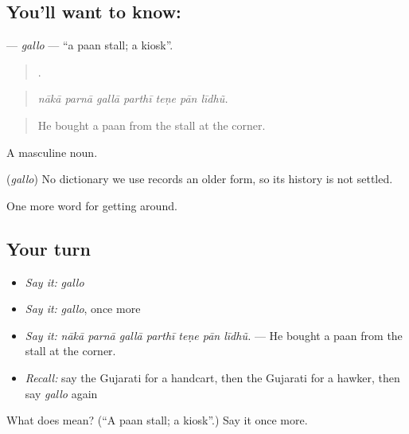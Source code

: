 \subsection*{You'll want to know: }
\textbf{} — \emph{gallo} — \textquotedblleft{}a paan stall; a kiosk\textquotedblright{}.

\begin{quote}
      .
\end{quote}

\begin{quote}
\emph{nākā parnā gallā parthī teṇe pān līdhũ.}
\end{quote}

\begin{quote}
He bought a paan from the stall at the corner.
\end{quote}

A masculine noun.

\begin{cousinweb}
\textbf{} (\emph{gallo}) No dictionary we use records an older form, so its history is not settled.
\end{cousinweb}

\begin{grammarlens}[title={What you've built}]
One more word for getting around.
\end{grammarlens}

\subsection*{Your turn}
\begin{itemize}
\raggedright
  \item \emph{Say it:} \emph{gallo}
  \item \emph{Say it:} \emph{gallo}, once more
  \item \emph{Say it:} \emph{nākā parnā gallā parthī teṇe pān līdhũ.} — He bought a paan from the stall at the corner.
  \item \emph{Recall:} say the Gujarati for a handcart, then the Gujarati for a hawker, then say \emph{gallo} again
\end{itemize}

\begin{tcolorbox}[breakable,colback=teal!4,colframe=teal!35!black,title={Before you move on}]
What does  mean? (\textquotedblleft{}A paan stall; a kiosk\textquotedblright{}.) Say it once more.
\end{tcolorbox}
